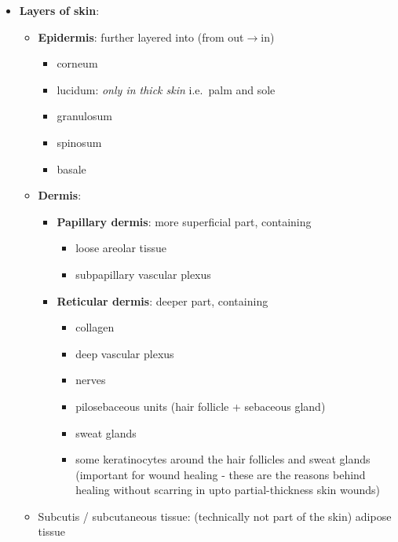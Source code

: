 \documentclass[
  12pt,
]{memoir}
\providecommand{\tightlist}{%
  \setlength{\itemsep}{0pt}\setlength{\parskip}{0pt}}
\begin{document}
\begin{itemize}
\tightlist
\item
  \textbf{Layers of skin}:

  \begin{itemize}
  \tightlist
  \item
    \textbf{Epidermis}: further layered into (from out\(\rightarrow\)in)

    \begin{itemize}
    \tightlist
    \item
      corneum
    \item
      lucidum: \emph{only in thick skin} i.e.~palm and sole
    \item
      granulosum
    \item
      spinosum
    \item
      basale
    \end{itemize}
  \item
    \textbf{Dermis}:

    \begin{itemize}
    \tightlist
    \item
      \textbf{Papillary dermis}: more superficial part, containing

      \begin{itemize}
      \tightlist
      \item
        loose areolar tissue
      \item
        subpapillary vascular plexus
      \end{itemize}
    \item
      \textbf{Reticular dermis}: deeper part, containing

      \begin{itemize}
      \tightlist
      \item
        collagen
      \item
        deep vascular plexus
      \item
        nerves
      \item
        pilosebaceous units (hair follicle + sebaceous gland)
      \item
        sweat glands
      \item
        some keratinocytes around the hair follicles and sweat glands
        (important for wound healing - these are the reasons behind
        healing without scarring in upto partial-thickness skin wounds)
      \end{itemize}
    \end{itemize}
  \item
    Subcutis / subcutaneous tissue: (technically not part of the skin)
    adipose tissue
  \end{itemize}
\end{itemize}
\end{document}
